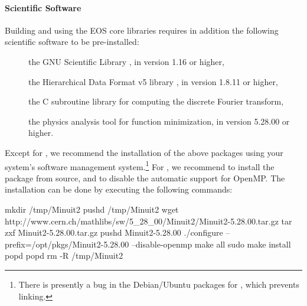 \paragraph{Scientific Software} Building and using the EOS core libraries requires in addition
the following scientific software to be pre-installed:
\begin{description}
    \item[] the GNU Scientific Library \cite{GSL}, in version 1.16 or higher,
    \item[] the Hierarchical Data Format v5 library \cite{HDF5}, in version 1.8.11 or higher,
    \item[] the C subroutine library for computing the discrete Fourier transform,
    \item[] the physics analysis tool for function minimization, in version 5.28.00 or higher.
\end{description}
Except for , we recommend the installation of the above packages using your system's
software management system.\footnote{%
    There is presently a bug in the Debian/Ubuntu packages for , which prevents
    linking.
}
For , we recommend to install the package from source, and to
disable the automatic support for OpenMP. The installation can be done by
executing the following commands:
\begin{commandline}
mkdir /tmp/Minuit2
pushd /tmp/Minuit2
wget http://www.cern.ch/mathlibs/sw/5_28_00/Minuit2/Minuit2-5.28.00.tar.gz
tar zxf Minuit2-5.28.00.tar.gz
pushd Minuit2-5.28.00
./configure --prefix=/opt/pkgs/Minuit2-5.28.00 --disable-openmp
make all
sudo make install
popd
popd
rm -R /tmp/Minuit2
\end{commandline}

